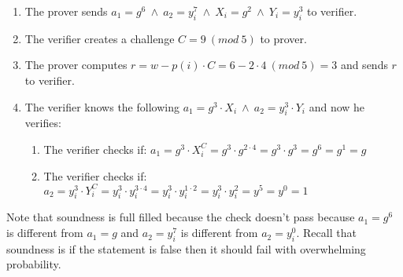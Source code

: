 \begin{enumerate}
    \item The prover sends \begin{math}a_1=g^6 \ \land\ a_2=y_i^7 \ \land \ X_i=g^2 \ \land \ Y_i=y_i^3 \end{math} to verifier.
    \item The verifier creates a challenge \begin{math}C=9\ (mod \ 5) \end{math} to prover.
    \item The prover computes \begin{math}r=w-p(i)  \cdot  C = 6-2  \cdot  4 \ (mod \ 5)= 3\end{math} and sends $r$ to verifier.
    \item The verifier knows the following  \begin{math}a_1=g^3  \cdot  X_i \ \land \ a_2=y_i^3  \cdot  Y_i \end{math} and now he verifies:
    \begin{enumerate}        
        \item The verifier checks if: \begin{math}a_1 = g^3 \cdot X_i^C = g^3 \cdot g^{2 \cdot 4} = g^3  \cdot  g^3 = g^6= g^1= g\end{math}
        \item The verifier checks if: \begin{math} a_2=y_i^3  \cdot  Y_i^C = y_i^3  \cdot  y_i^{3 \cdot 4}= y_i^3  \cdot  y_i^{1 \cdot 2}= y_i^3  \cdot  y_i^2= y^5=y^0= 1 \end{math}
    \end{enumerate}
\end{enumerate}

\noindent
Note that soundness is full filled because the check doesn't pass because $a_1=g^6$ is different from $a_1=g$ and $a_2=y_i^7$ is different from $ a_2=y_i^0$. Recall that soundness is if the statement is false then it should fail with overwhelming probability.\\

